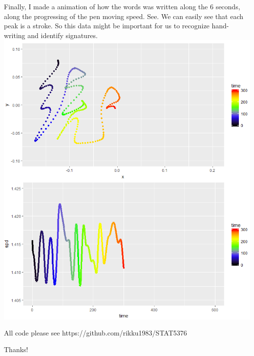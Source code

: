\documentclass[11pt]{scrartcl}
\begin{document}
Finally, I made a animation of how the words was written along the 6 seconds, along the progressing of the pen moving speed. See. We can easily see that each peak is a stroke. So this data might be important for us to recognize hand-writing and identify signatures.\\
\includegraphics[scale=0.5]{fp010.png}\\

\bigskip

All code please see https://github.com/rikku1983/STAT5376\\
\bigskip

Thanks!
\end{document}
